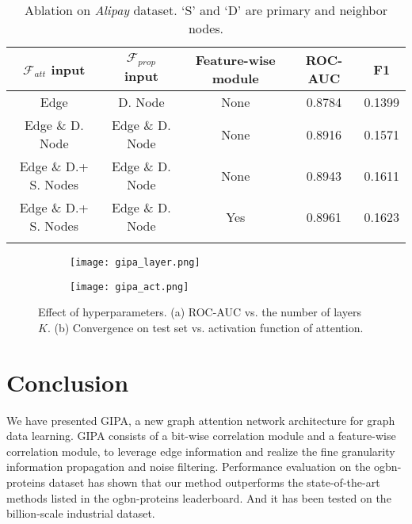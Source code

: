\documentclass[runningheads]{llncs}
\newcommand{\model}{GIPA\xspace}
\begin{document}
\begin{table}[t]
\centering
\caption{Ablation on \textit{Alipay} dataset. `S' and `D' are  primary and neighbor nodes.}
\begin{tabular}{ccccc}
\hline
$\mathcal{F}_{att}$ input & $\mathcal{F}_{prop}$ input& Feature-wise module & ROC-AUC & F1  \\ 
\hline
Edge & D. Node  & None & 0.8784 & 0.1399      \\
Edge \&  D. Node  & Edge \&  D. Node & None & 0.8916 & 0.1571    \\
Edge \&  D.+ S. Nodes & Edge \&  D. Node & None &0.8943 &0.1611    \\
Edge \&  D.+ S. Nodes & Edge \&  D. Node & Yes & 0.8961 &0.1623    \\
\hline
\label{tab:ali_performance}
\end{tabular}
\vspace{-0.6cm}
\end{table}
\begin{figure*}[t!]\label{layer}
    \centering
  \begin{subfigure}[b]{0.44\linewidth}
    \texttt{[image: gipa\_layer.png]}
    \caption{ }
    \label{fig:layer}
  \end{subfigure}
   \begin{subfigure}[b]{0.46\linewidth}
    \texttt{[image: gipa\_act.png]}
    \caption{ }
 \label{fig:activation}
  \end{subfigure}
\vspace{-0.3cm}
\caption{Effect of hyperparameters. (a) ROC-AUC vs. the number of layers $K$. (b) Convergence on test set vs. activation function of attention.}
\vspace{-0.3cm}
\end{figure*}

\section{Conclusion}
We have presented \model, a new graph attention network architecture for graph data learning.
\model consists of a bit-wise correlation module and a feature-wise correlation module, to leverage edge information and realize the fine granularity information propagation and noise filtering.
Performance evaluation on the ogbn-proteins dataset has shown that our method outperforms the state-of-the-art methods listed in the ogbn-proteins leaderboard.
And it has been tested on the billion-scale industrial dataset.


\end{document}
